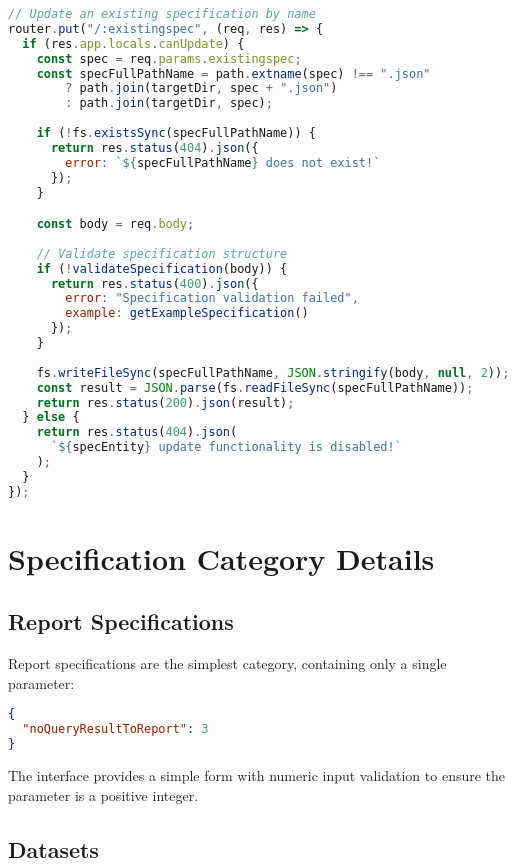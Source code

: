 \documentclass[11pt,a4paper]{article}
\begin{document}
\begin{lstlisting}[language=JavaScript, caption=PUT Endpoint Implementation]
// Update an existing specification by name
router.put("/:existingspec", (req, res) => {
  if (res.app.locals.canUpdate) {
    const spec = req.params.existingspec;
    const specFullPathName = path.extname(spec) !== ".json"
        ? path.join(targetDir, spec + ".json")
        : path.join(targetDir, spec);
    
    if (!fs.existsSync(specFullPathName)) {
      return res.status(404).json({ 
        error: `${specFullPathName} does not exist!` 
      });
    }

    const body = req.body;
    
    // Validate specification structure
    if (!validateSpecification(body)) {
      return res.status(400).json({
        error: "Specification validation failed",
        example: getExampleSpecification()
      });
    }
    
    fs.writeFileSync(specFullPathName, JSON.stringify(body, null, 2));
    const result = JSON.parse(fs.readFileSync(specFullPathName));
    return res.status(200).json(result);
  } else {
    return res.status(404).json(
      `${specEntity} update functionality is disabled!`
    );
  }
});
\end{lstlisting}

\section{Specification Category Details}

\subsection{Report Specifications}

Report specifications are the simplest category, containing only a single parameter:

\begin{lstlisting}[language=JSON, caption=Report Specification Example]
{
  "noQueryResultToReport": 3
}
\end{lstlisting}

The interface provides a simple form with numeric input validation to ensure the parameter is a positive integer.

\subsection{Datasets}
\end{document}
